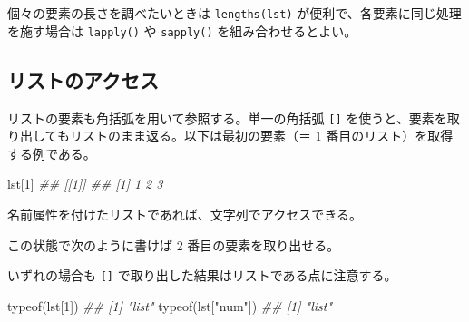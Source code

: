 \documentclass[
  letterpaper,
  xelatex,
  ja=standard, xelatex]{bxjsbook}
\newenvironment{Shaded}{\begin{snugshade}}{\end{snugshade}}
\newcommand{\AttributeTok}[1]{\textcolor[rgb]{0.40,0.45,0.13}{#1}}
\newcommand{\DecValTok}[1]{\textcolor[rgb]{0.68,0.00,0.00}{#1}}
\newcommand{\DocumentationTok}[1]{\textcolor[rgb]{0.37,0.37,0.37}{\textit{#1}}}
\newcommand{\FunctionTok}[1]{\textcolor[rgb]{0.28,0.35,0.67}{#1}}
\newcommand{\NormalTok}[1]{\textcolor[rgb]{0.00,0.23,0.31}{#1}}
\newcommand{\OtherTok}[1]{\textcolor[rgb]{0.00,0.23,0.31}{#1}}
\newcommand{\StringTok}[1]{\textcolor[rgb]{0.13,0.47,0.30}{#1}}
\begin{document}
個々の要素の長さを調べたいときは \texttt{lengths(lst)}
が便利で、各要素に同じ処理を施す場合は \texttt{lapply()} や
\texttt{sapply()} を組み合わせるとよい。

\subsection{リストのアクセス}\label{ux30eaux30b9ux30c8ux306eux30a2ux30afux30bbux30b9}

リストの要素も角括弧を用いて参照する。単一の角括弧 \texttt{{[}{]}}
を使うと、要素を取り出してもリストのまま返る。以下は最初の要素（＝ 1
番目のリスト）を取得する例である。

\begin{Shaded}
\begin{Highlighting}[]
\NormalTok{lst[}\DecValTok{1}\NormalTok{]}
\DocumentationTok{\#\# [[1]]}
\DocumentationTok{\#\# [1] 1 2 3}
\end{Highlighting}
\end{Shaded}

名前属性を付けたリストであれば、文字列でアクセスできる。

\begin{Shaded}
\end{Shaded}

この状態で次のように書けば 2 番目の要素を取り出せる。

\begin{Shaded}
\end{Shaded}

いずれの場合も \texttt{{[}{]}}
で取り出した結果はリストである点に注意する。

\begin{Shaded}
\begin{Highlighting}[]
\FunctionTok{typeof}\NormalTok{(lst[}\DecValTok{1}\NormalTok{])}
\DocumentationTok{\#\# [1] "list"}
\FunctionTok{typeof}\NormalTok{(lst[}\StringTok{"num"}\NormalTok{])}
\DocumentationTok{\#\# [1] "list"}
\end{Highlighting}
\end{Shaded}
\end{document}
